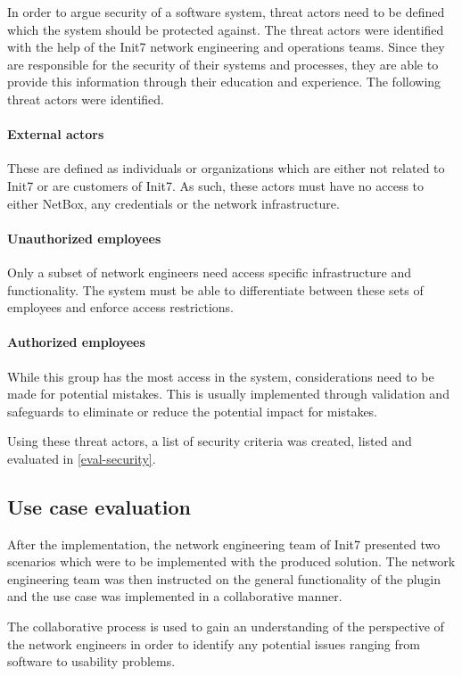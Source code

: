 In order to argue security of a software system, threat actors need to be
defined which the system should be protected against. The threat actors
were identified with the help of the Init7 network engineering and operations
teams. Since they are responsible for the security of their systems and processes,
they are able to provide this information through their education and experience.
The following threat actors were identified.

\paragraph{External actors} These are defined as individuals or organizations
which are either not related to Init7 or are customers of Init7. As such,
these actors must have no access to either NetBox, any credentials or
the network infrastructure.

\paragraph{Unauthorized employees} Only a subset of network engineers need
access specific infrastructure and functionality. The system must be
able to differentiate between these sets of employees and enforce access
restrictions.

\paragraph{Authorized employees} While this group has the most access in
the system, considerations need to be made for potential mistakes.
This is usually implemented through validation and safeguards to eliminate
or reduce the potential impact for mistakes.

Using these threat actors, a list of security criteria was created,
listed and evaluated in \ref{eval-security}.

\subsection{Use case evaluation}

After the implementation, the network engineering team of Init7 presented
two scenarios which were to be implemented with the produced solution.
The network engineering team was then instructed on the general
functionality of the plugin and the use case was implemented in
a collaborative manner.

The collaborative process is used to gain an understanding of the perspective
of the network engineers in order to identify any potential issues
ranging from software to usability problems.